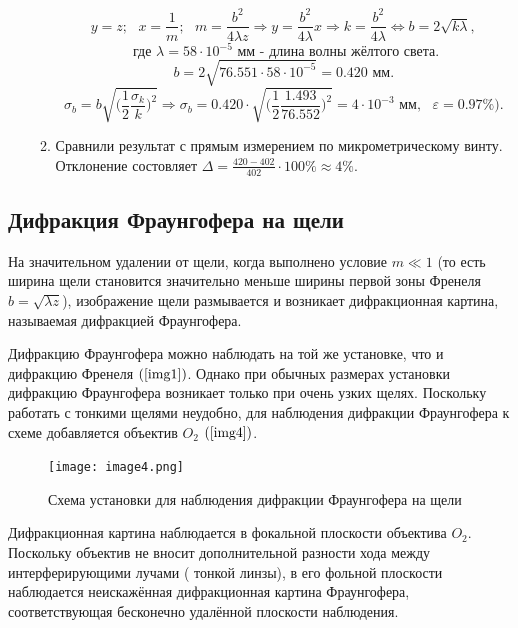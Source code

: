 \documentclass[a4paper,12pt]{article} %
\begin{document}
\begin{enumerate}
\begin{enumerate}
    \[ y=z;\text{ }x=\frac{1}{m};\text{ }m=\frac{b^2}{4\lambda z} \Longrightarrow y=\frac{b^2}{4\lambda}x\Longrightarrow k = \frac{b^2}{4\lambda} \Leftrightarrow b = 2\sqrt{k\lambda},\]
    \[\text{ где }\lambda=58\cdot10^{-5}\text{ мм}\text{ - длина волны жёлтого света.} \]
    \[ b=2\sqrt{76.551\cdot58\cdot10^{-5}}=0.420\text{ мм}. \]
    \[ \sigma_{b} = b\sqrt{\Big(\frac{1}{2}\frac{\sigma_{k}}{k}\Big)^2} \Longrightarrow \sigma_{b} = 0.420\cdot\sqrt{\Big(\frac{1}{2}\frac{1.493}{76.552}\Big)^2}=4\cdot10^{-3}\text{ мм}, \text{ }\varepsilon=0.97\%). \]

    \centering{}

    \item Сравнили результат с прямым измерением по микрометрическому винту. Отклонение состовляет $\Delta=\frac{420-402}{402}\cdot100\%\approx4\%$.

    \end{enumerate}

\end{enumerate}

\subsection{Дифракция Фраунгофера на щели}

На значительном удалении от щели, когда выполнено условие $m\ll1$ (то есть ширина щели становится значительно меньше ширины первой зоны Френеля $b=\sqrt{\lambda z}$), изображение щели размывается и возникает дифракционная картина, называемая дифракцией Фраунгофера.

Дифракцию Фраунгофера можно наблюдать на той же установке, что и дифракцию Френеля $(\ref{img1})$. Однако при обычных размерах установки дифракцию Фраунгофера возникает только при очень узких щелях. Поскольку работать с тонкими щелями неудобно, для наблюдения дифракции Фраунгофера к схеме добавляется объектив $O_2$ $(\ref{img4})$.

\begin{figure}[h]
\begin{center}
    \texttt{[image: image4.png]}
\end{center}
\caption{Схема установки для наблюдения дифракции Фраунгофера на щели}
\label{img4}
\end{figure}

Дифракционная картина наблюдается в фокальной плоскости объектива $O_2$. Поскольку объектив не вносит дополнительной разности хода между интерферирующими лучами ( тонкой линзы), в его фольной плоскости наблюдается неискажённая дифракционная картина Фраунгофера, соответствующая бесконечно удалённой плоскости наблюдения.
\end{document}
